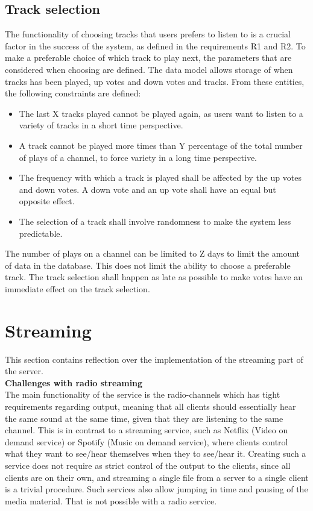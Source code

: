 \documentclass[a4paper,11pt,report]{article}
\begin{document}
\subsection{Track selection}
The functionality of choosing tracks that users prefers to listen to is a crucial factor in the success of the system, as defined in the requirements R1 and R2. To make a preferable choice of which track to play next, the parameters that are considered when choosing are defined. The data model allows storage of when tracks has been played, up votes and down votes and tracks. From these entities, the following constraints are defined:
\begin{itemize}
\item The last X tracks played cannot be played again, as users want to listen to a variety of tracks in a short time perspective.
\item A track cannot be played more times than Y percentage of the total number of plays of a channel, to force variety in a long time perspective.
\item The frequency with which a track is played shall be affected by the up votes and down votes. A down vote and an up vote shall have an equal but opposite effect.
\item The selection of a track shall involve randomness to make the system less predictable.
\end{itemize}
The number of plays on a channel can be limited to Z days to limit the amount of data in the database. This does not limit the ability to choose a preferable track. The track selection shall happen as late as possible to make votes have an immediate effect on the track selection. 

\section{Streaming}
This section contains reflection over the implementation of the streaming part of the server. \\

\textbf{Challenges with radio streaming} \\
The main functionality of the service is the radio-channels which has tight requirements regarding output, meaning that all clients should essentially hear the same sound at the same time, given that they are listening to the same channel.
This is in contrast to a streaming service, such as Netflix (Video on demand service) or Spotify (Music on demand service), where clients control what they want to see/hear themselves when they to see/hear it. Creating such a service does not require as strict control of the output to the clients, since all clients are on their own, and streaming a single file from a server to a single client is a trivial procedure. Such services also allow jumping in time and pausing of the media material. That is not possible with a radio service.\\
\end{document}
